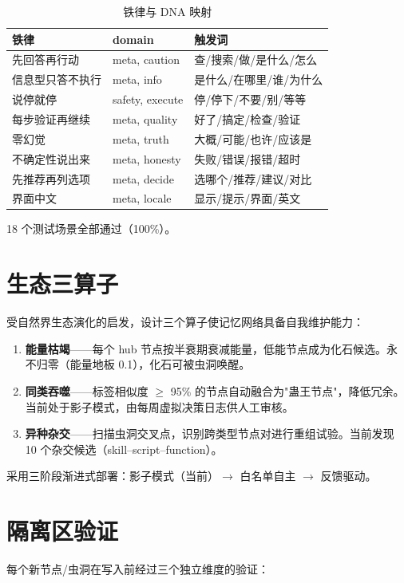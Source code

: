 \documentclass[11pt,a4paper]{article}
\begin{document}
\begin{table}[ht]
\centering
\caption{铁律与 DNA 映射}
\label{tab:rules}
\begin{tabular}{lll}
\toprule
铁律 & domain & 触发词 \\
\midrule
先回答再行动 & meta, caution & 查/搜索/做/是什么/怎么 \\
信息型只答不执行 & meta, info & 是什么/在哪里/谁/为什么 \\
说停就停 & safety, execute & 停/停下/不要/别/等等 \\
每步验证再继续 & meta, quality & 好了/搞定/检查/验证 \\
零幻觉 & meta, truth & 大概/可能/也许/应该是 \\
不确定性说出来 & meta, honesty & 失败/错误/报错/超时 \\
先推荐再列选项 & meta, decide & 选哪个/推荐/建议/对比 \\
界面中文 & meta, locale & 显示/提示/界面/英文 \\
\bottomrule
\end{tabular}
\end{table}

18 个测试场景全部通过（100\%）。

\section{生态三算子}
受自然界生态演化的启发，设计三个算子使记忆网络具备自我维护能力：

\begin{enumerate}[label=\textbf{算子 \arabic*：}]
  \item \textbf{能量枯竭}——每个 hub 节点按半衰期衰减能量，低能节点成为化石候选。永不归零（能量地板 0.1），化石可被虫洞唤醒。
  \item \textbf{同类吞噬}——标签相似度 $\geq$ 95\% 的节点自动融合为"蛊王节点"，降低冗余。当前处于影子模式，由每周虚拟决策日志供人工审核。
  \item \textbf{异种杂交}——扫描虫洞交叉点，识别跨类型节点对进行重组试验。当前发现 10 个杂交候选（skill--script--function）。
\end{enumerate}

采用三阶段渐进式部署：影子模式（当前）$\to$ 白名单自主 $\to$ 反馈驱动。

\section{隔离区验证}
每个新节点/虫洞在写入前经过三个独立维度的验证：
\end{document}
